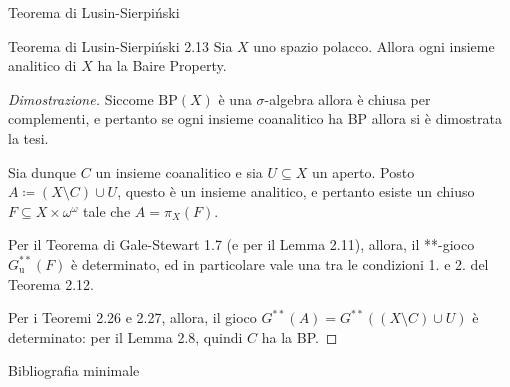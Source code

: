 \documentclass[babel]{beamer}
\renewcommand{\href}[2]{#2}
\begin{document}
\begin{frame}[label={sec:org1ea7ae6}]{Teorema di Lusin-Sierpiński}
\begin{alertblock}{Teorema di Lusin-Sierpiński 2.13}
Sia \(X\) uno \href{../../../../../../../org/roam/20250301194013-spazio_polacco.org}{spazio polacco}. Allora ogni \href{../../../../../../../org/roam/20250525220742-insieme_analitico.org}{insieme analitico} di \(X\) ha la \href{../../../../../../../org/roam/20250514154039-proprieta_di_baire.org}{Baire Property}.
\end{alertblock}
\begin{proof}[Dimostrazione]
Siccome \(\mathrm{BP}(X)\) è una \href{../../../../../../../org/roam/20250526100313-sigma_algebra.org}{\(\sigma\)-algebra} allora è chiusa per complementi, e pertanto se ogni insieme coanalitico ha BP allora si è dimostrata la tesi.

Sia dunque \(C\) un insieme coanalitico e sia \(U \subseteq X\) un aperto. Posto \(A\coloneqq (X\setminus C)\cup U\), questo è un insieme analitico, e pertanto  esiste un chiuso \(F \subseteq X\times\omega^{\omega}\) tale che \(A=\pi_{X}(F)\).

Per il \href{../../../../../../../org/roam/20250514144736-teorema_di_gale_stewart.org}{Teorema di Gale-Stewart} 1.7 (e per il Lemma 2.11), allora, il \href{../../../../../../../org/roam/20250513111844-gioco_di_banach_mazur.org}{**-gioco \(G^{ * *}_{\text{u}}(F)\)} è \href{../../../../../../../org/roam/20250513155732-logic_game.org}{determinato}, ed in particolare vale una tra le condizioni 1. e 2. del Teorema 2.12.

Per i \href{../../../../../../../org/roam/20250514174717-teorema_di_caratterizzazione_dei_comagri_tramite_il_gioco_di_banach_mazur.org}{Teoremi} 2.26 e 2.27, allora, il \href{../../../../../../../org/roam/20250513111844-gioco_di_banach_mazur.org}{gioco \(G^{**}(A) = G^{ * *}\left((X\setminus C) \cup U\right)\)} è determinato: per il Lemma 2.8, quindi \(C\) ha la BP.
\end{proof}
\end{frame}

\begin{frame}[label={sec:orgdd9b26a}]{Bibliografia minimale}
\nocite{*}
\printbibliography
\end{frame}
\end{document}
